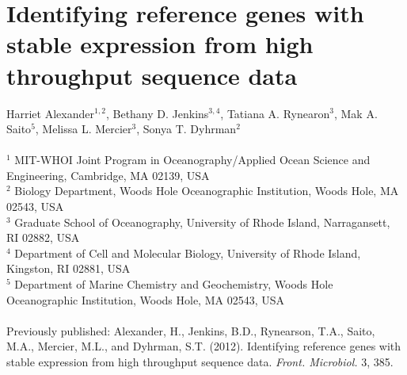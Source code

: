 
\chapter{Identifying reference genes with stable expression from high throughput sequence data}
\raggedbottom
\begin{singlespace}
Harriet Alexander$^{1,2}$, Bethany D. Jenkins$^{3,4}$, Tatiana A. Rynearon$^{3}$, Mak A. Saito$^{5}$, Melissa L. Mercier$^{3}$, Sonya T. Dyhrman$^{2}$\\
\\
$^{1}$ MIT-WHOI Joint Program in Oceanography/Applied Ocean Science and Engineering, Cambridge, MA 02139, USA\\
$^2$ Biology Department, Woods Hole Oceanographic Institution, Woods Hole, MA 02543, USA\\
$^3$ Graduate School of Oceanography, University of Rhode Island, Narragansett, RI 02882, USA\\
$^4$ Department of Cell and Molecular Biology, University of Rhode Island, Kingston, RI 02881, USA\\
$^5$ Department of Marine Chemistry and Geochemistry, Woods Hole Oceanographic Institution, Woods Hole, MA 02543, USA\\
\\
Previously published: Alexander, H., Jenkins, B.D., Rynearson, T.A., Saito, M.A., Mercier, M.L., and Dyhrman, S.T. (2012). Identifying reference genes with stable expression from high throughput sequence data. \emph{Front. Microbiol.} 3, 385.
\end{singlespace}

